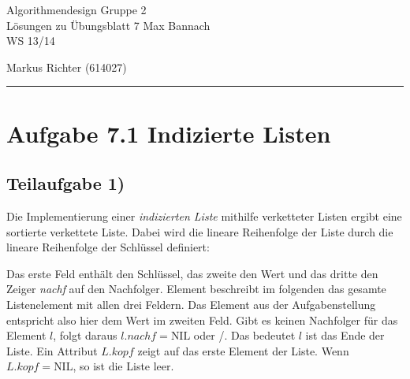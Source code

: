 \documentclass[a4paper, fontsize=10pt]{scrartcl}
\begin{document}
 

{\large Algorithmendesign \hfill Gruppe 2}\\  
{\large Lösungen zu Übungsblatt 7} \hfill Max Bannach\\
{\large WS 13/14}
\begin{flushright}Markus Richter (614027)\end{flushright}
\rule{\textwidth}{.3mm}

\section*{Aufgabe 7.1 Indizierte Listen}
\subsection*{Teilaufgabe 1)}
Die Implementierung einer \emph{indizierten Liste} mithilfe verketteter Listen ergibt eine sortierte verkettete Liste. Dabei wird die lineare Reihenfolge der Liste durch die lineare Reihenfolge der Schlüssel definiert: 
\begin{center}
\end{center}

Das erste Feld enthält den Schlüssel, das zweite den Wert und das dritte den Zeiger \emph{nachf} auf den Nachfolger. Element beschreibt im folgenden das gesamte Listenelement mit allen drei Feldern. Das Element aus der Aufgabenstellung entspricht also hier dem Wert im zweiten Feld. Gibt es keinen Nachfolger für das Element $l$, folgt daraus $l.nachf=\textrm{NIL}$ oder /. Das bedeutet $l$ ist das Ende der Liste. Ein Attribut $L.kopf$ zeigt auf das erste Element der Liste. Wenn $L.kopf=\textrm{NIL}$, so ist die Liste leer.
\bigskip
\end{document}
